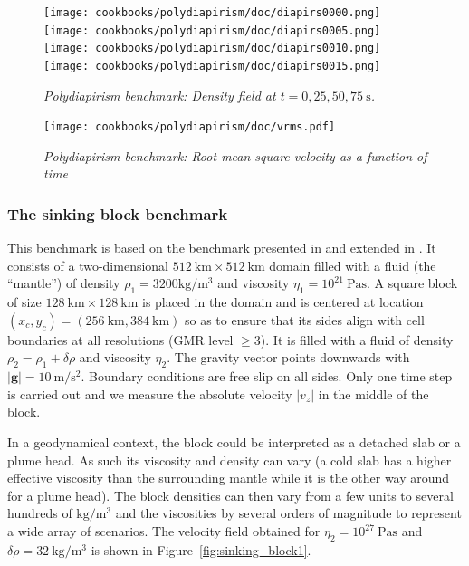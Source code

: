 \documentclass{article}
\begin{document}
\begin{figure}
    \centering
    \texttt{[image: cookbooks/polydiapirism/doc/diapirs0000.png]}
    \texttt{[image: cookbooks/polydiapirism/doc/diapirs0005.png]}
    \texttt{[image: cookbooks/polydiapirism/doc/diapirs0010.png]}
    \texttt{[image: cookbooks/polydiapirism/doc/diapirs0015.png]}
    \caption{\it Polydiapirism benchmark: Density field at $t=0,25,50,75~\si{\second}$.}
    \label{fig:polydiapirs_density}
\end{figure}

\begin{figure}
    \centering
    \texttt{[image: cookbooks/polydiapirism/doc/vrms.pdf]}
    \caption{\it Polydiapirism benchmark: Root mean square velocity as a function of time}
    \label{fig:polydiapirs_vrms}
\end{figure}

\subsubsection{The sinking block benchmark}
\label{sec:sinking_block}

This benchmark is based on the benchmark presented in \cite{gery10} and extended in \cite{thie11}.
It consists of a two-dimensional $512~\si{\km}\times 512~\si{\km}$ domain filled with a fluid (the ``mantle'')
of density $\rho_1=3200\si{\kg\per\cubic\meter}$ and viscosity $\eta_1=10^{21}~\si{\pascal\second}$.
A square block of size $128~\si{\km}\times 128~\si{\km}$ is placed in the domain and is centered at location $(x_c,y_c)=(256~\si{\km},384~\si{\km})$
so as to ensure that its sides align with cell boundaries at all resolutions (GMR level $\geq 3$). It is filled with a fluid of density
$\rho_2=\rho_1+\delta \rho$ and viscosity $\eta_2$. The gravity vector points downwards with
$|\boldsymbol{g}|=10~\si{\meter\per\square\second}$. Boundary conditions are free slip on all sides.
Only one time step is carried out and we measure the absolute velocity $|v_z|$ in the middle of the block.

In a geodynamical context, the block could be interpreted as a detached slab or a plume head.
As such its viscosity and density can vary (a cold slab has a higher effective viscosity than the surrounding mantle while
it is the other way around for a plume head). The block densities can then vary from a few units to several
hundreds of $\si{\kg\per\cubic\meter}$ and the viscosities by several orders of magnitude to represent a wide array of scenarios.
The velocity field obtained for $\eta_2=10^{27}~\si{\pascal\second}$ and $\delta\rho=32~\si{\kg\per\cubic\meter}$ is shown in
Figure~\ref{fig:sinking_block1}.
\end{document}
